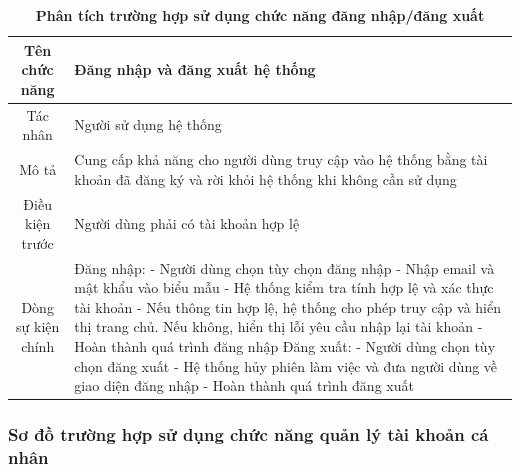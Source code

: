 \begin{table}[H]
	\caption{\bfseries \fontsize{12pt}{0pt}\selectfont Phân tích trường hợp sử dụng chức năng đăng nhập/đăng xuất}
	\centering
	\begin{tabularx}{0.9\textwidth}{|c|X|}
		\hline
		\textbf{Tên chức năng} & \textbf{Đăng nhập và đăng xuất hệ thống}                                                                                    \\
		\hline
		Tác nhân               & Người sử dụng hệ thống                                                                                                      \\
		\hline
		Mô tả                  & Cung cấp khả năng cho người dùng truy cập vào hệ thống bằng tài khoản đã đăng ký và rời khỏi hệ thống khi không cần sử dụng \\
		\hline
		Điều kiện trước        & Người dùng phải có tài khoản hợp lệ                                                                                         \\
		\hline
		Dòng sự kiện chính     &
		Đăng nhập: \newline
		- Người dùng chọn tùy chọn đăng nhập \newline
		- Nhập email và mật khẩu vào biểu mẫu \newline
		- Hệ thống kiểm tra tính hợp lệ và xác thực tài khoản \newline
		- Nếu thông tin hợp lệ, hệ thống cho phép truy cập và hiển thị trang chủ. Nếu không, hiển thị lỗi yêu cầu nhập lại tài khoản\newline
		- Hoàn thành quá trình đăng nhập \newline
		Đăng xuất: \newline
		- Người dùng chọn tùy chọn đăng xuất \newline
		- Hệ thống hủy phiên làm việc và đưa người dùng về giao diện đăng nhập  \newline
		- Hoàn thành quá trình đăng xuất                                                                                                                     \\
		\hline
	\end{tabularx}
\end{table}

\subsubsection{Sơ đồ trường hợp sử dụng chức năng quản lý tài khoản cá nhân}

